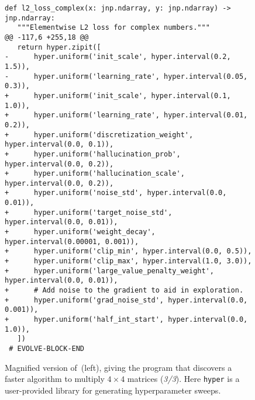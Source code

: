 \begin{figure}[p]
\begin{adjustbox}{width=0.9\textwidth}
\begin{minipage}{0.9\textwidth}
\begin{lstlisting}[style=pydiff, backgroundcolor=\color{backcolour}, firstnumber=131]
 def l2_loss_complex(x: jnp.ndarray, y: jnp.ndarray) -> jnp.ndarray:
   """Elementwise L2 loss for complex numbers."""
@@ -117,6 +255,18 @@
   return hyper.zipit([
-      hyper.uniform('init_scale', hyper.interval(0.2, 1.5)),
-      hyper.uniform('learning_rate', hyper.interval(0.05, 0.3)),
+      hyper.uniform('init_scale', hyper.interval(0.1, 1.0)),
+      hyper.uniform('learning_rate', hyper.interval(0.01, 0.2)),
+      hyper.uniform('discretization_weight', hyper.interval(0.0, 0.1)),
+      hyper.uniform('hallucination_prob', hyper.interval(0.0, 0.2)),
+      hyper.uniform('hallucination_scale', hyper.interval(0.0, 0.2)),
+      hyper.uniform('noise_std', hyper.interval(0.0, 0.01)),
+      hyper.uniform('target_noise_std', hyper.interval(0.0, 0.01)),
+      hyper.uniform('weight_decay', hyper.interval(0.00001, 0.001)),
+      hyper.uniform('clip_min', hyper.interval(0.0, 0.5)),
+      hyper.uniform('clip_max', hyper.interval(1.0, 3.0)),
+      hyper.uniform('large_value_penalty_weight', hyper.interval(0.0, 0.01)),
+      # Add noise to the gradient to aid in exploration.
+      hyper.uniform('grad_noise_std', hyper.interval(0.0, 0.001)),
+      hyper.uniform('half_int_start', hyper.interval(0.0, 1.0)),
   ])
 # EVOLVE-BLOCK-END
\end{lstlisting}
\end{minipage}
\end{adjustbox}
\caption{Magnified version of~(left), giving the program that discovers a faster algorithm to multiply $4\times4$ matrices  (\emph{3/3}). Here \texttt{hyper} is a user-provided library for generating hyperparameter sweeps.}\label{fig:relaxed-opt-diff-appendix-3}
\centering
\end{figure}